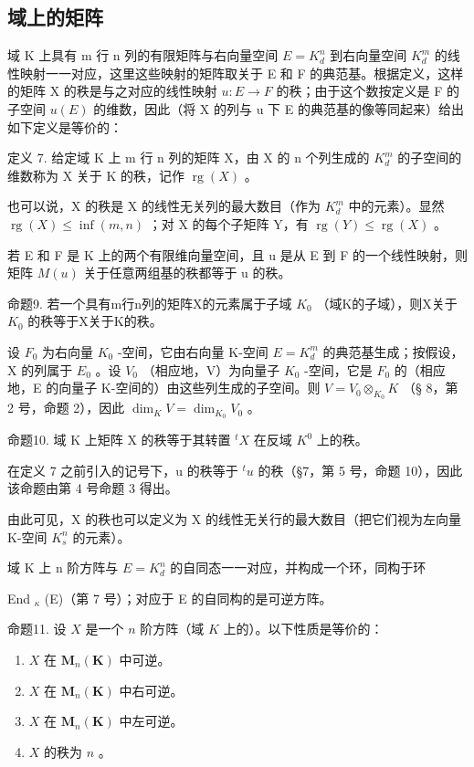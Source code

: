 \subsection{域上的矩阵}

域 K 上具有 m 行 n 列的有限矩阵与右向量空间 \(E = K_{d}^{n}\) 到右向量空间 \(K_{d}^{m}\) 的线性映射一一对应，这里这些映射的矩阵取关于 E 和 F 的典范基。根据定义，这样的矩阵 X 的秩是与之对应的线性映射 \(u: E \to F\) 的秩；由于这个数按定义是 F 的子空间 \(u(E)\) 的维数，因此（将 X 的列与 u 下 E 的典范基的像等同起来）给出如下定义是等价的：

定义 7. 给定域 K 上 m 行 n 列的矩阵 X，由 X 的 n 个列生成的 \(K_{d}^{m}\) 的子空间的维数称为 X 关于 K 的秩，记作 \(\operatorname{rg}(X)\) 。

也可以说，X 的秩是 X 的线性无关列的最大数目（作为 \(K_{d}^{m}\) 中的元素）。显然 \(\operatorname{rg}(X) \leqslant \inf(m, n)\) ；对 X 的每个子矩阵 Y，有 \(\operatorname{rg}(Y) \leqslant \operatorname{rg}(X)\) 。

若 E 和 F 是 K 上的两个有限维向量空间，且 u 是从 E 到 F 的一个线性映射，则矩阵 \(M(u)\) 关于任意两组基的秩都等于 u 的秩。

命题9. 若一个具有m行n列的矩阵X的元素属于子域 \(K_{0}\) （域K的子域），则X关于 \(K_{0}\) 的秩等于X关于K的秩。

设 \(F_{0}\) 为右向量 \(K_{0}\) -空间，它由右向量 K-空间 \(E = K_{d}^{m}\) 的典范基生成；按假设，X 的列属于 \(E_{0}\) 。设 \(V_{0}\) （相应地，V）为向量子 \(K_{0}\) -空间，它是 \(F_{0}\) 的（相应地，E 的向量子 K-空间的）由这些列生成的子空间。则 \(V = V_{0} \otimes_{K_{0}} K\) （§ 8，第 2 号，命题 2），因此 \(\dim_{K} V = \dim_{K_{0}} V_{0}\) 。

命题10. 域 K 上矩阵 X 的秩等于其转置 \(^{t}X\) 在反域 \(K^{0}\) 上的秩。

在定义 7 之前引入的记号下，u 的秩等于 \({}^{t}u\) 的秩（§7，第 5 号，命题 10），因此该命题由第 4 号命题 3 得出。

由此可见，X 的秩也可以定义为 X 的线性无关行的最大数目（把它们视为左向量 K-空间 \(K_{s}^{n}\) 的元素）。

域 K 上 n 阶方阵与 \(E = K_{d}^{n}\) 的自同态一一对应，并构成一个环，同构于环

End \(_{\kappa}\) (E)（第 7 号）；对应于 E 的自同构的是可逆方阵。

命题11. 设 \(X\) 是一个 \(n\) 阶方阵（域 \(K\) 上的）。以下性质是等价的：

\begin{enumerate}
\def\labelenumi{(\alph{enumi})}
\item
  \(X\) 在 \(\mathbf{M}_n(\mathbf{K})\) 中可逆。
\item
  \(X\) 在 \(\mathbf{M}_n(\mathbf{K})\) 中右可逆。
\item
  \(X\) 在 \(\mathbf{M}_n(\mathbf{K})\) 中左可逆。
\item
  \(X\) 的秩为 \(n\) 。
\end{enumerate}

